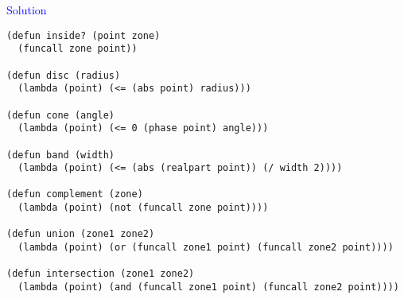 \documentclass{slides}
\newcommand{\ti}[1]{\begin{center}\Large{\textcolor{blue}{#1}}\end{center}}
\begin{document}
\begin{slide}\ti{Solution}

{\small\begin{verbatim}
(defun inside? (point zone)
  (funcall zone point))

(defun disc (radius)
  (lambda (point) (<= (abs point) radius)))

(defun cone (angle)
  (lambda (point) (<= 0 (phase point) angle)))

(defun band (width)
  (lambda (point) (<= (abs (realpart point)) (/ width 2))))

(defun complement (zone)
  (lambda (point) (not (funcall zone point))))

(defun union (zone1 zone2)
  (lambda (point) (or (funcall zone1 point) (funcall zone2 point))))

(defun intersection (zone1 zone2)
  (lambda (point) (and (funcall zone1 point) (funcall zone2 point))))
\end{verbatim}
}

\vfill\end{slide}


\end{document}
